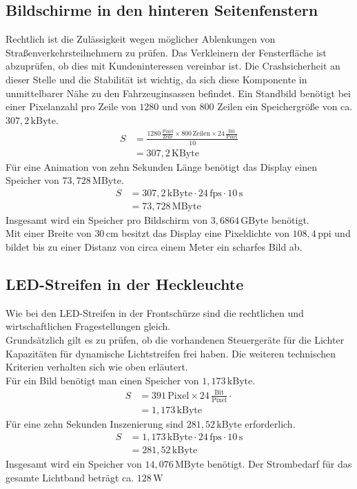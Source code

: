 \subsection{Bildschirme in den hinteren Seitenfenstern}
Rechtlich ist die Zulässigkeit wegen möglicher Ablenkungen von Straßenverkehrsteilnehmern zu prüfen.
Das Verkleinern der Fensterfläche ist abzuprüfen, ob dies mit Kundeninteressen vereinbar ist.
Die Crashsicherheit an dieser Stelle und die Stabilität ist wichtig, da sich diese Komponente in unmittelbarer Nähe zu den Fahrzeuginsassen befindet.
Ein Standbild benötigt bei einer Pixelanzahl pro Zeile von $ 1280 $ und von $ 800 $ Zeilen ein Speichergröße von ca. $ 307,2\,\mathrm{kByte}$. 
\begin{align}
	S &= \frac{1280\,\frac{\mathrm{Pixel}}{\mathrm{Zeile}}\times 800\,\mathrm{Zeilen} \times 24\,\frac{\mathrm{Bit}}{\mathrm{Pixel}}}{10} \\
	&= 307,2\,\mathrm{KByte}
\end{align}
Für eine Animation von zehn Sekunden Länge benötigt das Display einen Speicher von $ 73,728\,\mathrm{MByte}$.
\begin{align}
	S &= 307,2\,\mathrm{kByte} \cdot 24\,\mathrm{fps} \cdot 10\,\mathrm{s}\\
	&= 73,728\,\mathrm{MByte}
\end{align}
Insgesamt wird ein Speicher pro Bildschirm von $ 3,6864\,\mathrm{GByte} $ benötigt. \\
Mit einer Breite von $ 30\,\mathrm{cm} $ besitzt das Display eine Pixeldichte von $ 108,4\,\mathrm{ppi} $ und bildet bis zu einer Distanz von circa einem Meter ein scharfes Bild ab.
\subsection{LED-Streifen in der Heckleuchte}
Wie bei den LED-Streifen in der Frontschürze sind die rechtlichen und wirtschaftlichen Fragestellungen gleich. \\
Grundsätzlich gilt es zu prüfen, ob die vorhandenen Steuergeräte für die Lichter Kapazitäten für dynamische Lichtstreifen frei haben.
Die weiteren technischen Kriterien verhalten sich wie oben erläutert. \\
Für ein Bild benötigt man einen Speicher von $ 1,173\,\mathrm{kByte} $.
\begin{align}
	S &= 391\,\mathrm{Pixel} \times 24\,\frac{\mathrm{Bit}}{\mathrm{Pixel}} \cdot \\
	&= 1,173\,\mathrm{kByte}
\end{align}
Für eine zehn Sekunden Inszenierung sind $ 281,52\,\mathrm{kByte} $ erforderlich.
\begin{align}
	S &= 1,173\,\mathrm{kByte} \cdot 24\,\mathrm{fps} \cdot 10\,\mathrm{s} \\
	&= 281,52\,\mathrm{kByte}
\end{align}
Insgesamt wird ein Speicher von $ 14,076\,\mathrm{MByte} $ benötigt.
Der Strombedarf für das gesamte Lichtband beträgt ca. $ 128\,\mathrm{W} $
